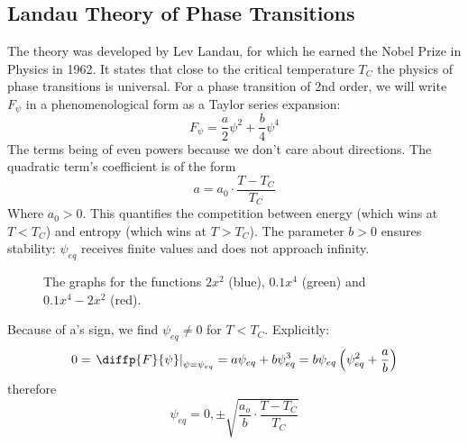 \subsection{Landau Theory of Phase Transitions}
The theory was developed by Lev Landau, for which he earned the Nobel Prize in Physics in 1962. It states that close to the critical temperature \(T_C \) the physics of phase transitions is universal. For a phase transition of 2nd order, we will write \(F_\psi \) in a phenomenological form as a Taylor series expansion:
\begin{equation}
	F_\psi = \frac{a}{2}\psi^2+\frac{b}{4}\psi^4
\end{equation}
The terms being of even powers because we don't care about directions. The quadratic term's coefficient is of the form
\begin{equation}
	a=a_0\cdot\frac{T-T_C}{T_C}
\end{equation}
Where \(a_0>0\). This quantifies the competition between energy (which wins at \(T<T_C\)) and entropy (which wins at \(T>T_C\)). The parameter \(b>0\) ensures stability: \(\psi_{eq}\) receives finite values and does not approach infinity.
\begin{figure}[!htb]
	\centering
	\caption{The graphs for the functions \(2x^2\) (blue), \(0.1x^4\) (green) and \(0.1x^4-2x^2\) (red).}
\end{figure}
Because of a's sign, we find \(\psi_{eq}\neq0\) for \(T<T_C\). Explicitly:
\begin{equation}
	0=\left.\diffp{F}{\psi}\right|_{\psi=\psi_{eq}}=a\psi_{eq}+b\psi_{eq}^3=b\psi_{eq}\left(\psi_{eq}^2+\frac{a}{b}\right)
\end{equation}
therefore
\begin{equation}\label{solution_psi_eq_ch1}
	\psi_{eq} = 0, \pm \sqrt{\frac{a_o}{b}\cdot\frac{T-T_C}{T_C}}
\end{equation}
